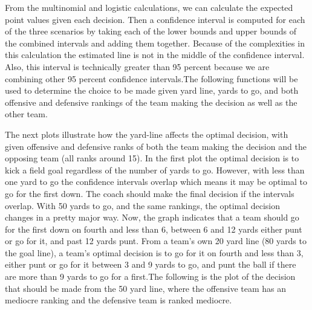 \documentclass[letterpaper,10pt,english]{/anaconda/lib/python2.7/site-packages/sphinx/texinputs/sphinxhowto}
\begin{document}
From the multinomial and logistic calculations, we can calculate the
expected point values given each decision. Then a confidence interval is
computed for each of the three scenarios by taking each of the lower
bounds and upper bounds of the combined intervals and adding them
together. Because of the complexities in this calculation the estimated
line is not in the middle of the confidence interval. Also, this
interval is technically greater than 95 percent because we are combining
other 95 percent confidence intervals.The following functions will be used to determine the choice to be made
given yard line, yards to go, and both offensive and defensive rankings
of the team making the decision as well as the other team.







The next plots illustrate how the yard-line affects the optimal
decision, with given offensive and defensive ranks of both the team
making the decision and the opposing team (all ranks around 15). In the
first plot the optimal decision is to kick a field goal regardless of
the number of yards to go. However, with less than one yard to go the
confidence intervals overlap which means it may be optimal to go for the
first down. The coach should make the final decision if the intervals
overlap. With 50 yards to go, and the same rankings, the optimal
decision changes in a pretty major way. Now, the graph indicates that a
team should go for the first down on fourth and less than 6, between 6
and 12 yards either punt or go for it, and past 12 yards punt. From a
team's own 20 yard line (80 yards to the goal line), a team's optimal
decision is to go for it on fourth and less than 3, either punt or go
for it between 3 and 9 yards to go, and punt the ball if there are more
than 9 yards to go for a first.The following is the plot of the decision that should be made from the
50 yard line, where the offensive team has an mediocre ranking and the
defensive team is ranked mediocre.


    

        
        

            
\end{document}
